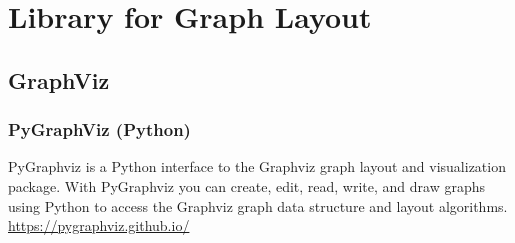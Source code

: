 \chapter{Library for Graph Layout}


\section{GraphViz}
\label{sec:GraphViz}


\subsection{PyGraphViz (Python)}
\label{sec:PyGraphViz}

PyGraphviz is a Python interface to the Graphviz graph layout and visualization
package. With PyGraphviz you can create, edit, read, write, and draw graphs
using Python to access the Graphviz graph data structure and layout algorithms.
\url{https://pygraphviz.github.io/}



